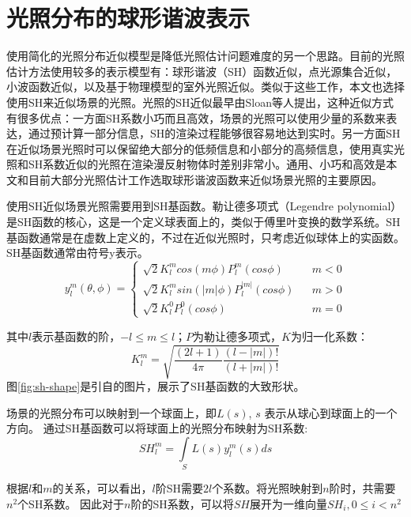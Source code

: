 \section{光照分布的球形谐波表示}
使用简化的光照分布近似模型是降低光照估计问题难度的另一个思路。目前的光照估计方法使用较多的表示模型有：球形谐波（SH）函数近似，点光源集合近似，小波函数近似，以及基于物理模型的室外光照近似。类似于这些工作，本文也选择使用SH来近似场景的光照。光照的SH近似最早由Sloan等人\cite{sloan2002precomputed}提出，这种近似方式有很多优点：一方面SH系数小巧而且高效，场景的光照可以使用少量的系数来表达，通过预计算一部分信息，SH的渲染过程能够很容易地达到实时。另一方面SH在近似场景光照时可以保留绝大部分的低频信息和小部分的高频信息，使用真实光照和SH系数近似的光照在渲染漫反射物体时差别非常小。通用、小巧和高效是本文和目前大部分光照估计工作选取球形谐波函数来近似场景光照的主要原因。

使用SH近似场景光照需要用到SH基函数。勒让德多项式（Legendre polynomial）是SH函数的核心，这是一个定义球表面上的，类似于傅里叶变换的数学系统。SH基函数通常是在虚数上定义的，不过在近似光照时，只考虑近似球体上的实函数。SH基函数通常由符号y表示。
\begin{equation}
y^m_l(\theta, \phi)=\left\{
    \begin{array}{lcl}
        \sqrt{2}K^m_lcos(m\phi)P^m_l(cos\phi) & & {m<0}\\
        \sqrt{2}K^m_lsin(|m|\phi)P^|m|_l(cos\phi) & & {m>0}\\
        \sqrt{2}K^0_lP^0_l(cos\phi) & & {m=0}
    \end{array} \right. 
\end{equation}

其中$l$表示基函数的阶，$-l \leq m \leq l$；$P$为勒让德多项式，$K$为归一化系数：
\begin{equation}
    K^m_l=\sqrt{\frac{(2l+1)}{4\pi}\frac{(l-|m|)!}{(l+|m|)!}}
\end{equation}
图\ref{fig:sh-shape}是引自\cite{green2003spherical}的图片，展示了SH基函数的大致形状。



场景的光照分布可以映射到一个球面上，即$L(s)$, $s$ 表示从球心到球面上的一个方向。
通过SH基函数可以将球面上的光照分布映射为SH系数:
\begin{equation}
    SH^m_l = \int\limits_{S}L(s)y^m_l(s)ds
\end{equation}

根据$l$和$m$的关系，可以看出，$l$阶SH需要$2l$个系数。将光照映射到$n$阶时，共需要$n^2$个SH系数。
因此对于$n$阶的SH系数，可以将$SH$展开为一维向量$SH_i, 0 \leq i < n^2$


